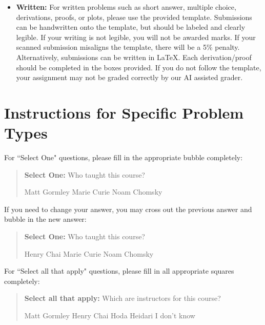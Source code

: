 \documentclass[11pt,addpoints,answers]{exam}
\newcommand{\blackcircle}{\tikz\draw[black,fill=black] (0,0) circle (1ex);}
\begin{document}
\begin{itemize}
\begin{itemize}
   \item \textbf{Written:} For written problems such as short answer, multiple choice, derivations, proofs, or plots, please use the provided template. Submissions can be handwritten onto the template, but should be labeled and clearly legible. If your writing is not legible, you will not be awarded marks. If your scanned submission misaligns the template, there will be a 5\% penalty. Alternatively, submissions can be written in LaTeX. 
   Each derivation/proof should be completed in the boxes provided. If you do not follow the template, your assignment may not be graded correctly by our AI assisted grader.
  \end{itemize}

\end{itemize}\clearpage

\section*{Instructions for Specific Problem Types}

For ``Select One" questions, please fill in the appropriate bubble completely:

\begin{quote}
\textbf{Select One:} Who taught this course?
    \begin{checkboxes}
     \CorrectChoice Matt Gormley
     \choice Marie Curie
     \choice Noam Chomsky
    \end{checkboxes}
\end{quote}

If you need to change your answer, you may cross out the previous answer and bubble in the new answer:

\begin{quote}
\textbf{Select One:} Who taught this course?
    {
    \begin{checkboxes}
     \CorrectChoice Henry Chai
     \choice Marie Curie \checkboxchar{\xcancel{\blackcircle}{}}
     \choice Noam Chomsky
    \end{checkboxes}
    }
\end{quote}

For ``Select all that apply" questions, please fill in all appropriate squares completely:

\begin{quote}
\textbf{Select all that apply:} Which are instructors for this course?
    {%
    \checkboxchar{$\Box$} \checkedchar{$\blacksquare$} %
    \begin{checkboxes}
    \CorrectChoice Matt Gormley  
    \CorrectChoice Henry Chai
    \CorrectChoice Hoda Heidari
    \choice I don't know
    \end{checkboxes}
    }
\end{quote}
\end{document}
